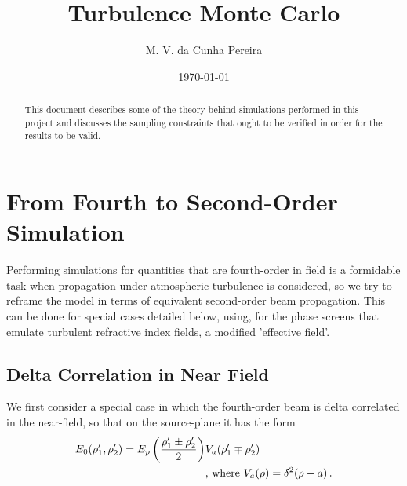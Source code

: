 \documentclass[12pt]{article}
\title{Turbulence Monte Carlo}
\author{M. V. da Cunha Pereira}
\date{\today}
\begin{document}
  \maketitle 
\begin{abstract}
This document describes some of the theory behind simulations performed in this project and discusses the sampling constraints that ought to be verified in order for the results to be valid.
\end{abstract}

\section{From Fourth to Second-Order Simulation}
Performing simulations for quantities that are fourth-order in field is a formidable task when propagation under atmospheric turbulence is considered, so we try to reframe the model in terms of equivalent second-order beam propagation. This can be done for special cases detailed below, using, for the phase screens that emulate turbulent refractive index fields, a modified 'effective field'.

\subsection{Delta Correlation in Near Field}
We first consider a special case in which the fourth-order beam is delta correlated in the near-field, so that on the source-plane it has the form
\begin{align}
E_0(\rho_1^\prime, \rho_2^\prime) = E_p\left(\frac{\rho_1^\prime\pm \rho_2^\prime}{2}\right) &V_a(\rho_1^\prime\mp \rho_2^\prime) \hspace{1cm} \\
&\mbox{, where } V_a(\rho) = \delta^2(\rho-a) \, . \notag
\end{align}
\end{document}
